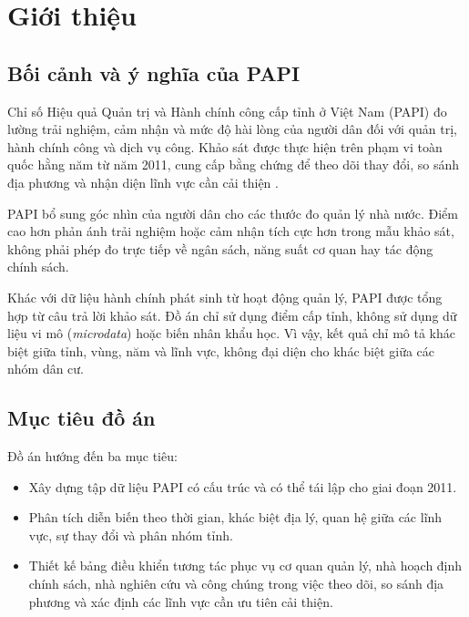\section{Giới thiệu}
\label{sec:introduction}

\subsection{Bối cảnh và ý nghĩa của PAPI}

Chỉ số Hiệu quả Quản trị và Hành chính công cấp tỉnh ở Việt Nam (PAPI) đo lường trải nghiệm, cảm nhận và mức độ hài lòng của người dân đối với quản trị, hành chính công và dịch vụ công. Khảo sát được thực hiện trên phạm vi toàn quốc hằng năm từ năm 2011, cung cấp bằng chứng để theo dõi thay đổi, so sánh địa phương và nhận diện lĩnh vực cần cải thiện \cite{undpPapiProject,undpPapi2024}.

PAPI bổ sung góc nhìn của người dân cho các thước đo quản lý nhà nước. Điểm cao hơn phản ánh trải nghiệm hoặc cảm nhận tích cực hơn trong mẫu khảo sát, không phải phép đo trực tiếp về ngân sách, năng suất cơ quan hay tác động chính sách.

Khác với dữ liệu hành chính phát sinh từ hoạt động quản lý, PAPI được tổng hợp từ câu trả lời khảo sát. Đồ án chỉ sử dụng điểm cấp tỉnh, không sử dụng dữ liệu vi mô (\textit{microdata}) hoặc biến nhân khẩu học. Vì vậy, kết quả chỉ mô tả khác biệt giữa tỉnh, vùng, năm và lĩnh vực, không đại diện cho khác biệt giữa các nhóm dân cư.

\subsection{Mục tiêu đồ án}

Đồ án hướng đến ba mục tiêu:

\begin{itemize}
    \setlength{\itemsep}{0.2em}
    \setlength{\parskip}{0pt}
    \item Xây dựng tập dữ liệu PAPI có cấu trúc và có thể tái lập cho giai đoạn 2011.
    \item Phân tích diễn biến theo thời gian, khác biệt địa lý, quan hệ giữa các lĩnh vực, sự thay đổi và phân nhóm tỉnh.
    \item Thiết kế bảng điều khiển tương tác phục vụ cơ quan quản lý, nhà hoạch định chính sách, nhà nghiên cứu và công chúng trong việc theo dõi, so sánh địa phương và xác định các lĩnh vực cần ưu tiên cải thiện.
\end{itemize}

